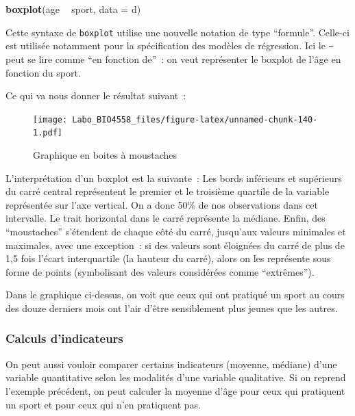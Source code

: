 \documentclass[12pt,]{book}
\makeatletter
\newenvironment{Shaded}{\begin{snugshade}}{\end{snugshade}}
\newcommand{\DataTypeTok}[1]{\textcolor[rgb]{0.13,0.29,0.53}{#1}}
\newcommand{\KeywordTok}[1]{\textcolor[rgb]{0.13,0.29,0.53}{\textbf{#1}}}
\newcommand{\NormalTok}[1]{#1}
\newcommand{\OperatorTok}[1]{\textcolor[rgb]{0.81,0.36,0.00}{\textbf{#1}}}
\newcommand{\StringTok}[1]{\textcolor[rgb]{0.31,0.60,0.02}{#1}}
\newenvironment{kframe}{%
\medskip{}
\setlength{\fboxsep}{.8em}
\def\at@end@of@kframe{}%
\ifinner\ifhmode%
 \def\at@end@of@kframe{\end{minipage}}%
 \begin{minipage}{\columnwidth}%
\fi\fi%
\def\FrameCommand##1{\hskip\@totalleftmargin \hskip-\fboxsep
\colorbox{incolor}{##1}\hskip-\fboxsep
    \hskip-\linewidth \hskip-\@totalleftmargin \hskip\columnwidth}%
\MakeFramed {\advance\hsize-\width
  \@totalleftmargin\z@ \linewidth\hsize
  \@setminipage}}%
{\par\unskip\endMakeFramed%
\at@end@of@kframe}
\newenvironment{rmdblock}[1]
 {
 \begin{itemize}
 \renewcommand{\labelitemi}{
   \raisebox{-.7\height}[0pt][0pt]{
     {\setkeys{Gin}{width=3em,keepaspectratio}\texttt{[image: images/\#1]}}
   }
 }
 \begin{kframe}
 \setlength{\fboxsep}{1em}
 \item
 }
 {
 \end{kframe}
 \end{itemize}
 }
\newenvironment{rmdnote}
  {\begin{rmdblock}{note}}
  {\end{rmdblock}}
\makeatother
\begin{document}
\begin{Shaded}
\begin{Highlighting}[]
\KeywordTok{boxplot}\NormalTok{(age }\OperatorTok{~}\StringTok{ }\NormalTok{sport, }\DataTypeTok{data =}\NormalTok{ d)}
\end{Highlighting}
\end{Shaded}

\begin{rmdnote}
Cette syntaxe de \texttt{boxplot} utilise une nouvelle notation de type
``formule''. Celle-ci est utilisée notamment pour la spécification des
modèles de régression. Ici le \texttt{\textasciitilde{}} peut se lire
comme ``en fonction de''~: on veut représenter le boxplot de l'âge en
fonction du sport.
\end{rmdnote}

Ce qui va nous donner le résultat suivant~:

\begin{figure}
\centering
\texttt{[image: Labo\_BIO4558\_files/figure-latex/unnamed-chunk-140-1.pdf]}
\caption{\label{fig:unnamed-chunk-140}Graphique en boites à moustaches}
\end{figure}

\begin{rmdnote}
L'interprétation d'un boxplot est la suivante~: Les bords inférieurs et
supérieurs du carré central représentent le premier et le troisième
quartile de la variable représentée sur l'axe vertical. On a donc 50\%
de nos observations dans cet intervalle. Le trait horizontal dans le
carré représente la médiane. Enfin, des ``moustaches'' s'étendent de
chaque côté du carré, jusqu'aux valeurs minimales et maximales, avec une
exception~: si des valeurs sont éloignées du carré de plus de 1,5 fois
l'écart interquartile (la hauteur du carré), alors on les représente
sous forme de points (symbolisant des valeurs considérées comme
``extrêmes'').
\end{rmdnote}

Dans le graphique ci-dessus, on voit que ceux qui ont pratiqué un sport au cours des douze derniers mois ont l'air d'être sensiblement plus jeunes que les autres.

\hypertarget{calculs-dindicateurs}{%
\subsubsection{Calculs d'indicateurs}\label{calculs-dindicateurs}}

On peut aussi vouloir comparer certains indicateurs (moyenne, médiane) d'une variable quantitative selon les modalités d'une variable qualitative. Si on reprend l'exemple précédent, on peut calculer la moyenne d'âge pour ceux qui pratiquent un sport et pour ceux qui n'en pratiquent pas.
\end{document}
